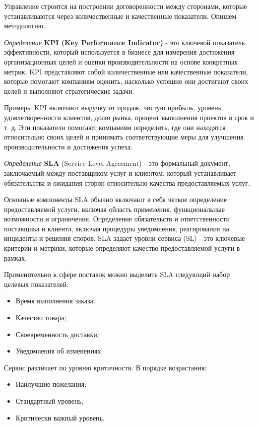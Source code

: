 Управление строится на построении договоренности между сторонами, которые устанавливаются через количественные и качественные показатели. Опишем методологию.

\textit{Определение} \textbf{KPI (Key Performance Indicator)} - это ключевой показатель эффективности, который используется в бизнесе для измерения достижения организационных целей и оценки производительности на основе конкретных метрик. KPI представляют собой количественные или качественные показатели, которые помогают компаниям оценить, насколько успешно они достигают своих целей и выполняют стратегические задачи.

Примеры KPI включают выручку от продаж, чистую прибыль, уровень удовлетворенности клиентов, долю рынка, процент выполнения проектов в срок и т. д. Эти показатели помогают компаниям определить, где они находятся относительно своих целей и принимать соответствующие меры для улучшения производительности и достижения успеха.

\textit{Определение} \textbf{SLA} (Service Level Agreement) - это формальный документ, заключаемый между поставщиком услуг  и клиентом, который устанавливает обязательства и ожидания сторон относительно качества предоставляемых услуг. 

Основные компоненты SLA обычно включают в себя четкое определение предоставляемой услуги, включая область применения, функциональные возможности и ограничения. Определение обязательств и ответственности поставщика и клиента, включая процедуры уведомления, реагирования на инциденты и решения споров. SLA задает уровни сервиса (SL) - это ключевые критерии и метрики, которые определяют качество предоставляемой услуги в рамках.

Применительно к сфере поставок можно выделить SLA следующий набор целевых показателей:
\begin{itemize}
    \item Время выполнения заказа;
    \item Качество товара;
    \item Своевременность доставки;
    \item Уведомления об изменениях.
\end{itemize}

Сервис различает по уровню критичности. В порядке возрастания:
\begin{itemize}
    \item Наилучшие пожелания;
    \item Стандартный уровень;
    \item Критически важный уровень.
\end{itemize}


